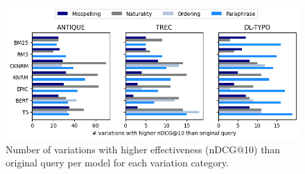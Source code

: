 \begin{figure}
    \centering
    \includegraphics[width=1\linewidth]{5Results/fusion/plot_pos_diffs.png}
    \caption{Number of variations with higher effectiveness (nDCG@10) than original query per model for each variation category.}
    \label{fig:pos-diffs}
\end{figure}
